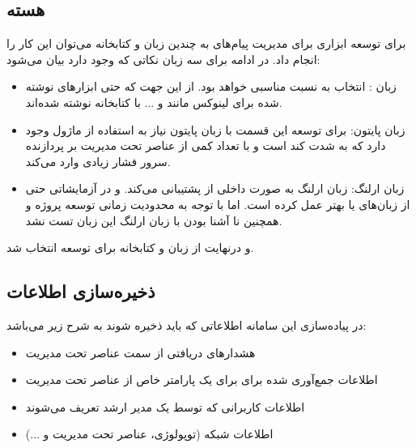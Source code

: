 \subsection{هسته }
برای توسعه ابزاری برای مدیریت پیام‌های  به چندین زبان و کتابخانه می‌توان این کار را انجام داد. در ادامه برای سه زبان نکاتی که وجود دارد بیان می‌شود:

\begin{itemize}
    \item زبان : انتخاب به نسبت مناسبی خواهد بود. از این جهت که حتی ابزارهای نوشته شده برای لینوکس مانند  و ... با کتابخانه  نوشته شده‌اند.
    \item زبان پایتون: برای توسعه این قسمت با زبان پایتون نیاز به استفاده از ماژول  وجود دارد که به شدت کند است و با تعداد کمی از عناصر تحت مدیریت بر پردازنده سرور فشار زیادی وارد می‌کند.
    \item زبان ارلنگ: زبان ارلنگ به صورت داخلی از  پشتیبانی می‌کند. و در آزمایشاتی حتی از زبان‌های  یا  بهتر عمل کرده است\cite{vychodil_answer_2015}. اما با توجه به محدودیت زمانی توسعه پروژه و همچنین نا آشنا بودن با زبان ارلنگ این زبان تست نشد.
\end{itemize}

و درنهایت از زبان  و کتابخانه  برای توسعه انتخاب شد.


\subsection{ذخیره‌سازی اطلاعات}

در پیاده‌سازی این سامانه اطلاعاتی که باید ذخیره شوند به شرح زیر می‌باشد:
\begin{itemize}
    \item هشدارهای دریافتی از سمت عناصر تحت مدیریت
    \item اطلاعات جمع‌آوری شده برای برای یک پارامتر خاص از عناصر تحت مدیریت
    \item اطلاعات کاربرانی که توسط یک مدیر ارشد تعریف می‌شوند
    \item اطلاعات شبکه‌ (توپولوژی، عناصر تحت مدیریت و ...)

\end{itemize}

